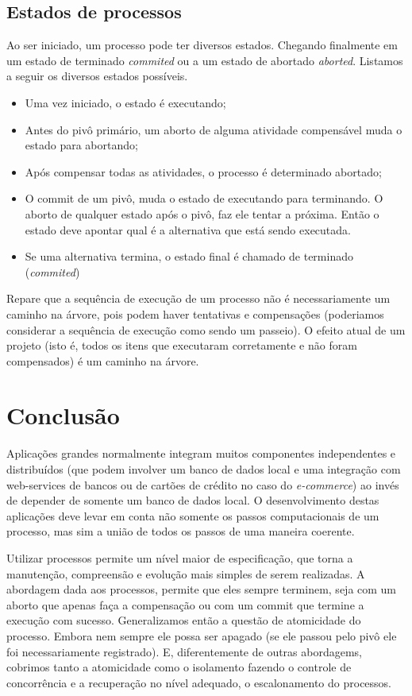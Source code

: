 \documentclass[a4paper,12pt,notitlepage]{article}
\begin{document}
\subsection{Estados de processos}

Ao ser iniciado, um processo pode ter diversos estados. Chegando finalmente em um estado de terminado \textit{commited} ou a um estado de abortado \textit{aborted}. Listamos a seguir os diversos estados possíveis. 

\begin{itemize}
  \item Uma vez iniciado, o estado é executando;
  \item Antes do pivô primário, um aborto de alguma atividade compensável muda o estado para abortando;
  \item Após compensar todas as atividades, o processo é determinado abortado;
  \item O commit de um pivô, muda o estado de executando para terminando. O aborto de qualquer estado após o pivô, faz ele tentar a próxima. Então o estado deve apontar qual é a alternativa que está sendo executada.
  \item Se uma alternativa termina, o estado final é chamado de terminado (\textit{commited})
\end{itemize}

Repare que a sequência de execução de um processo não é necessariamente um caminho na árvore, pois podem haver tentativas e compensações (poderiamos considerar a sequência de execução como sendo um passeio). O efeito atual de um projeto (isto é, todos os itens que executaram corretamente e não foram compensados) é um caminho na árvore. 




\newpage

\section{Conclusão}

Aplicações grandes normalmente integram muitos componentes independentes e distribuídos (que podem involver um banco de dados local e uma integração com web-services de bancos ou de cartões de crédito no caso do \textit{e-commerce}) ao invés de depender de 
somente um banco de dados local. O desenvolvimento destas aplicações deve levar em conta não somente os passos computacionais de um processo, mas sim a união de todos os passos de uma maneira coerente. 

Utilizar processos permite um nível maior de especificação, que torna a manutenção, compreensão e evolução mais simples de serem realizadas. A abordagem dada aos processos, permite que eles sempre terminem, seja com um aborto que apenas faça a compensação ou com um commit que termine a execução com sucesso. Generalizamos então a questão de atomicidade do processo. Embora nem sempre ele possa ser apagado (se ele passou pelo pivô ele foi necessariamente registrado). E, diferentemente de outras abordagems, cobrimos tanto a atomicidade como o isolamento fazendo o controle de concorrência e a recuperação no nível adequado, o escalonamento do processos.


 






{}

\end{document}
